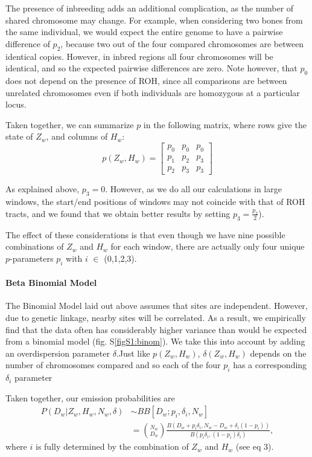 \documentclass[12pt, letterpaper]{article}
\begin{document}
The presence of inbreeding adds an additional complication, as the number of shared chromosome may change. For example, when considering two bones from the same individual, we would expect the entire genome to have a pairwise difference of $p_2$, because two out of the four compared chromosomes are between identical copies. However, in inbred regions all four chromosomes will be identical, and so the expected pairwise differences are zero. Note however, that $p_0$ does not depend on the presence of ROH, since all comparisons are between unrelated chromosomes even if both individuals are homozygous at a particular locus. 

Taken together, we can summarize $p$ in the following matrix, where rows give the state of $Z_w$, and columns of $H_w$:
\begin{equation}\label{eq:2}
    p(Z_w, H_w) = \left[\begin{array}
{rrr}
p_0 & p_0 & p_0 \\
p_1 & p_2 & p_3 \\
p_2 & p_3 & p_3
\end{array}\right]
\end{equation}

As explained above, $p_3 = 0$. However, as we do all our calculations in large windows, the start/end positions of windows may not coincide with that of ROH tracts, and we found that we obtain better results by setting $p_3 = \frac{p_2}{2}$).

The effect of these considerations is that even though we have nine possible combinations of $Z_w$ and $H_w$ for each window, there are actually only four unique $p$-parameters $p_i$ with $i$ $\in$ (0,1,2,3). 

\paragraph{Beta Binomial Model}
The Binomial Model laid out above assumes that sites are independent. However, due to genetic linkage, nearby sites will be correlated. As a result, we empirically find that the data often has considerably higher variance than would be expected from a binomial model (fig. S\ref{figS1:binom}). We take this into account by adding an overdispersion parameter $\delta$.Just like $p(Z_w,H_w)$, $\delta(Z_w,H_w)$ depends on the number of chromosomes compared and so each of the  four $p_i$ has a corresponding $\delta_i$ parameter 

Taken together, our emission probabilities are 
\begin{align}\label{eq:3}
P(D_{w}|Z_w,H_w,N_w, \delta) &\sim BB[D_w; p_i, \delta_i, N_w] \nonumber\\
&= \binom{N_w}{D_w}\frac{B(D_w+p_i \delta_{i}, N_w-D_w+ \delta_{i}(1-p_{i}))}{ B(p_{i}\delta_{i}, (1-p_{i})\delta_{i})},
\end{align}
where $i$ is fully determined by the combination of $Z_w$ and $H_w$ (see eq 3).
\end{document}
